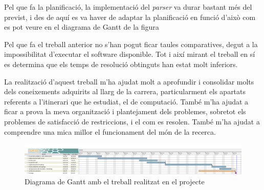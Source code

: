 \documentclass[11pt,a4paper,twoside]{report}
\begin{document}
  Pel que fa la planificació, la implementació del \textit{parser} va durar bastant més del previst, i des de aquí es va haver de adaptar la planificació en funció d'això com es pot veure en el diagrama de Gantt de la figura \label{fig:Gantt2}

  Pel que fa el treball anterior\cite{treballCristo} no s'han pogut ficar taules comparatives, 
  degut a la impossibilitat d'executar el software disponible. Tot i així mirant el treball en sí es determina que els temps de resolució obtinguts han estat molt inferiors. 


  La realització d'aquest treball m'ha ajudat molt a aprofundir i consolidar molts dels coneixements adquirits al llarg de la carrera, particularment els apartats referents a l'itinerari que he estudiat, el de computació. 
  També m'ha ajudat a ficar a prova la meva organització i plantejament dels problemes, sobretot els problemes de satisfacció de restriccions, i el com es resolen. 
  També m'ha ajudat a comprendre una mica millor el funcionament del món de la recerca. 


  \begin{figure}
    \centering
    \includegraphics[angle=90,origin=c,height=0.58\textheight]{Diagrames/gantt2.png} 
    \caption{Diagrama de Gantt amb el treball realitzat en el projecte}
    \label{fig:Gantt2}
  \end{figure}
 



  
  


\end{document}
